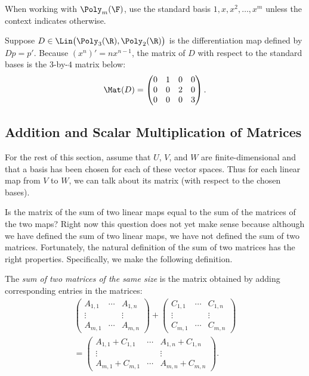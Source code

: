 When working with $\Poly_m(\F)$, use the standard basis
$1,x,x^2,\dots,x^m$ unless the context indicates otherwise.

\begin{example}\label{ax:3.33}
Suppose $D\in\Lin\bigl(\Poly_3(\R),\allowbreak\Poly_2(\R)\bigr)$ is the differentiation
map defined by $Dp=p'$. Because $(x^n)'=nx^{n-1}$, the matrix of $D$ with
respect to the standard bases is the $3$-by-$4$ matrix below:
\[ \Mat(D) = \begin{pmatrix} 0 & 1 & 0 & 0\\ 0 & 0 & 2 & 0\\ 0 & 0 & 0 & 3
   \end{pmatrix}. \]
\end{example}

\subsection{Addition and Scalar Multiplication of Matrices}

For the rest of this section, assume that $U$, $V$, and $W$ are
finite-dimensional and that a basis has been chosen for each of these vector
spaces. Thus for each linear map from $V$ to $W$, we can talk about its matrix
(with respect to the chosen bases).

Is the matrix of the sum of two linear maps equal to the sum of the matrices of
the two maps? Right now this question does not yet make sense because although
we have defined the sum of two linear maps, we have not defined the sum of two
matrices. Fortunately, the natural definition of the sum of two matrices has
the right properties. Specifically, we make the following definition.

\begin{definition}\label{ax:3.34}
The \emph{sum of two matrices of the same size} is the matrix obtained by
adding corresponding entries in the matrices:
\begin{multline*}
\begin{pmatrix} A_{1,1} & \cdots & A_{1,n}\\ \vdots & & \vdots\\
   A_{m,1} & \cdots & A_{m,n} \end{pmatrix}
 + \begin{pmatrix} C_{1,1} & \cdots & C_{1,n}\\ \vdots & & \vdots\\
   C_{m,1} & \cdots & C_{m,n} \end{pmatrix}\\
 = \begin{pmatrix} A_{1,1}+C_{1,1} & \cdots & A_{1,n}+C_{1,n}\\
   \vdots & & \vdots\\
   A_{m,1}+C_{m,1} & \cdots & A_{m,n}+C_{m,n} \end{pmatrix}.
\end{multline*}
\end{definition}

